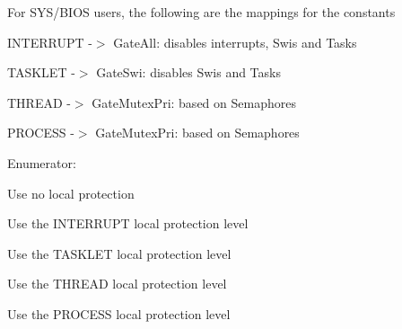 For SYS/BIOS users, the following are the mappings for the constants
\begin{DoxyItemize}
\item INTERRUPT -\/$>$ GateAll: disables interrupts, Swis and Tasks
\item TASKLET -\/$>$ GateSwi: disables Swis and Tasks
\item THREAD -\/$>$ GateMutexPri: based on Semaphores
\item PROCESS -\/$>$ GateMutexPri: based on Semaphores 
\end{DoxyItemize}\begin{Desc}
\item[Enumerator: ]\par
\begin{description}
\item[{\em 
GateMP\_\-LocalProtect\_\-NONE\label{_gate_m_p_8h_a3877bd64627d7449d3687e8b06939652a4577e1162c081ed8019a349318ab3afe}
}]Use no local protection \item[{\em 
GateMP\_\-LocalProtect\_\-INTERRUPT\label{_gate_m_p_8h_a3877bd64627d7449d3687e8b06939652aa4c5dba40613d5436adb6c604bb8514f}
}]Use the INTERRUPT local protection level \item[{\em 
GateMP\_\-LocalProtect\_\-TASKLET\label{_gate_m_p_8h_a3877bd64627d7449d3687e8b06939652aabb3d9eb4b679ceebb537775d388f2b1}
}]Use the TASKLET local protection level \item[{\em 
GateMP\_\-LocalProtect\_\-THREAD\label{_gate_m_p_8h_a3877bd64627d7449d3687e8b06939652a257bc8d4b8d6d19bdbe96cae37cbd908}
}]Use the THREAD local protection level \item[{\em 
GateMP\_\-LocalProtect\_\-PROCESS\label{_gate_m_p_8h_a3877bd64627d7449d3687e8b06939652aeec868d37052043812bc4c1829319a6d}
}]Use the PROCESS local protection level \end{description}
\end{Desc}

